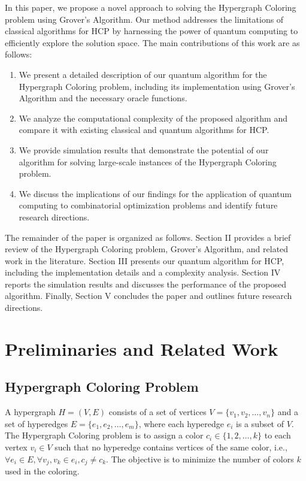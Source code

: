 In this paper, we propose a novel approach to solving the Hypergraph Coloring problem using Grover's Algorithm. Our method addresses the limitations of classical algorithms for HCP by harnessing the power of quantum computing to efficiently explore the solution space. The main contributions of this work are as follows:

\begin{enumerate}
    \item We present a detailed description of our quantum algorithm for the Hypergraph Coloring problem, including its implementation using Grover's Algorithm and the necessary oracle functions.
    \item We analyze the computational complexity of the proposed algorithm and compare it with existing classical and quantum algorithms for HCP.
    \item We provide simulation results that demonstrate the potential of our algorithm for solving large-scale instances of the Hypergraph Coloring problem.
    \item We discuss the implications of our findings for the application of quantum computing to combinatorial optimization problems and identify future research directions.
\end{enumerate}

The remainder of the paper is organized as follows. Section II provides a brief review of the Hypergraph Coloring problem, Grover's Algorithm, and related work in the literature. Section III presents our quantum algorithm for HCP, including the implementation details and a complexity analysis. Section IV reports the simulation results and discusses the performance of the proposed algorithm. Finally, Section V concludes the paper and outlines future research directions.

\section{Preliminaries and Related Work}

\subsection{Hypergraph Coloring Problem}

A hypergraph $H = (V, E)$ consists of a set of vertices $V = \{v_1, v_2, \ldots, v_n\}$ and a set of hyperedges $E = \{e_1, e_2, \ldots, e_m\}$, where each hyperedge $e_i$ is a subset of $V$. The Hypergraph Coloring problem is to assign a color $c_i \in \{1, 2, \ldots, k\}$ to each vertex $v_i \in V$ such that no hyperedge contains vertices of the same color, i.e., $\forall e_i \in E, \forall v_j, v_k \in e_i, c_j \neq c_k$. The objective is to minimize the number of colors $k$ used in the coloring.

